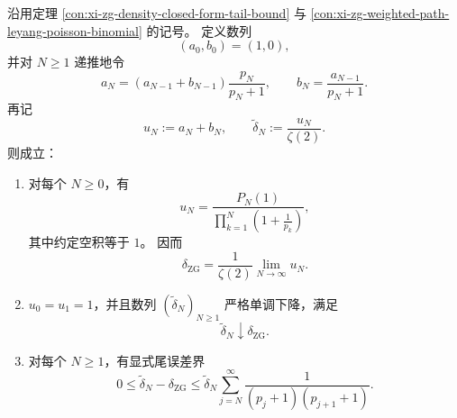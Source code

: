 \begin{proposition}\label{prop:xi-zg-prefix-recursion-monotone-tail-certificate}
沿用定理 \ref{con:xi-zg-density-closed-form-tail-bound} 与
\ref{con:xi-zg-weighted-path-leyang-poisson-binomial} 的记号。
定义数列
\[
(a_0,b_0)=(1,0),
\]
并对 \(N\ge 1\) 递推地令
\[
a_N=(a_{N-1}+b_{N-1})\frac{p_N}{p_N+1},
\qquad
b_N=\frac{a_{N-1}}{p_N+1}.
\]
再记
\[
u_N:=a_N+b_N,
\qquad
\widetilde\delta_N:=\frac{u_N}{\zeta(2)}.
\]
则成立：
\begin{enumerate}
  \item 对每个 \(N\ge 0\)，有
  \[
  u_N=
  \frac{P_N(1)}{\prod_{k=1}^{N}\left(1+\frac1{p_k}\right)},
  \]
  其中约定空积等于 \(1\)。
  因而
  \[
  \delta_{\mathrm{ZG}}
  =
  \frac{1}{\zeta(2)}\lim_{N\to\infty}u_N.
  \]
  \item \(u_0=u_1=1\)，并且数列 \((\widetilde\delta_N)_{N\ge 1}\) 严格单调下降，满足
  \[
  \widetilde\delta_N\downarrow \delta_{\mathrm{ZG}}.
  \]
  \item 对每个 \(N\ge 1\)，有显式尾误差界
  \[
  0\le \widetilde\delta_N-\delta_{\mathrm{ZG}}
  \le
  \widetilde\delta_N
  \sum_{j=N}^{\infty}\frac{1}{(p_j+1)(p_{j+1}+1)}.
  \]
\end{enumerate}
\end{proposition}
